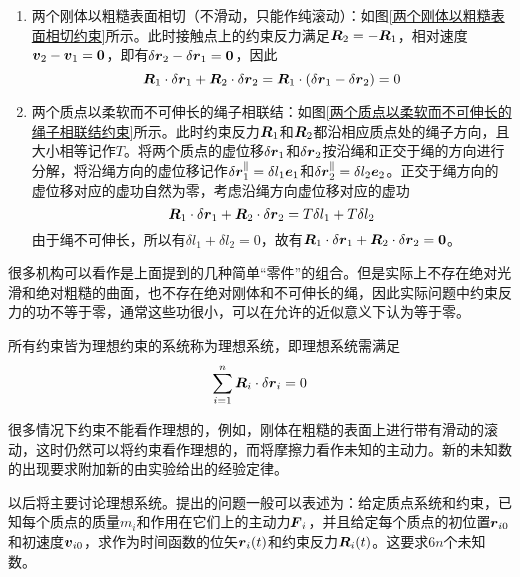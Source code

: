 \begin{enumerate}
\item 两个刚体以粗糙表面相切（不滑动，只能作纯滚动）：如图\ref{两个刚体以粗糙表面相切约束}所示。此时接触点上的约束反力满足$\boldsymbol{R}_2 =- \boldsymbol{R}_1$，相对速度$\boldsymbol{v}_2-\boldsymbol{v}_1= \boldsymbol{0}$，即有$\delta \boldsymbol{r}_2-\delta \boldsymbol{r}_1 = \boldsymbol{0}$，因此
\begin{equation*}
	\boldsymbol{R}_1 \cdot \delta \boldsymbol{r}_1 + \boldsymbol{R}_2 \cdot \delta \boldsymbol{r}_2 = \boldsymbol{R}_1 \cdot (\delta \boldsymbol{r}_1 - \delta \boldsymbol{r}_2) = 0
\end{equation*}
\item 两个质点以柔软而不可伸长的绳子相联结：如图\ref{两个质点以柔软而不可伸长的绳子相联结约束}所示。此时约束反力$\boldsymbol{R}_1$和$\boldsymbol{R}_2$都沿相应质点处的绳子方向，且大小相等记作$T$。将两个质点的虚位移$\delta \boldsymbol{r}_1$和$\delta \boldsymbol{r}_2$按沿绳和正交于绳的方向进行分解，将沿绳方向的虚位移记作$\delta \boldsymbol{r}_1^\parallel = \delta l_1\boldsymbol{e}_1$和$\delta \boldsymbol{r}_2^\parallel = \delta l_2 \boldsymbol{e}_2$。正交于绳方向的虚位移对应的虚功自然为零，考虑沿绳方向虚位移对应的虚功
\begin{equation*}
	\boldsymbol{R}_1 \cdot \delta \boldsymbol{r}_1 + \boldsymbol{R}_2 \cdot \delta \boldsymbol{r}_2 = T\delta l_1 + T\delta l_2
\end{equation*}
由于绳不可伸长，所以有$\delta l_1 + \delta l_2 = 0$，故有$\boldsymbol{R}_1 \cdot \delta \boldsymbol{r}_1 + \boldsymbol{R}_2 \cdot \delta \boldsymbol{r}_2 = \boldsymbol{0}$。
\end{enumerate}

很多机构可以看作是上面提到的几种简单“零件”的组合。但是实际上不存在绝对光滑和绝对粗糙的曲面，也不存在绝对刚体和不可伸长的绳，因此实际问题中约束反力的功不等于零，通常这些功很小，可以在允许的近似意义下认为等于零。

所有约束皆为理想约束的系统称为{\heiti 理想系统}，即理想系统需满足
\begin{equation*}
	\sum_{i=1}^n \boldsymbol{R}_i \cdot \delta \boldsymbol{r}_i = 0
\end{equation*}

很多情况下约束不能看作理想的，例如，刚体在粗糙的表面上进行带有滑动的滚动，这时仍然可以将约束看作理想的，而将摩擦力看作未知的主动力。新的未知数的出现要求附加新的由实验给出的经验定律。

以后将主要讨论理想系统。提出的问题一般可以表述为：给定质点系统和约束，已知每个质点的质量$m_i$和作用在它们上的主动力$\boldsymbol{F}_i$，并且给定每个质点的初位置$\boldsymbol{r}_{i0}$和初速度$\boldsymbol{v}_{i0}$，求作为时间函数的位矢$\boldsymbol{r}_i(t)$和约束反力$\boldsymbol{R}_i(t)$。这要求$6n$个未知数。